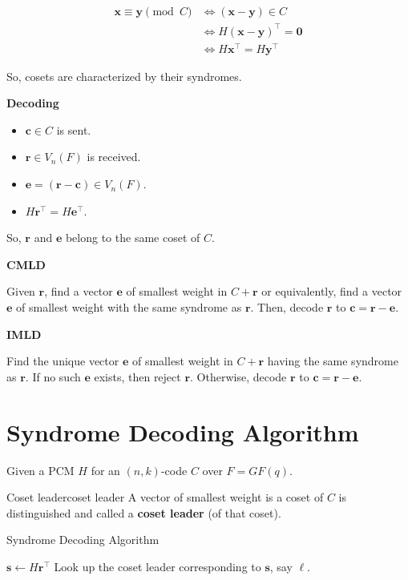 \begin{Proof}{}{}
    \begin{align*}
        \symbf{x}\equiv \symbf{y}\pmod{C}
         & \iff (\symbf{x}-\symbf{y})\in C            \\
         & \iff H(\symbf{x}-\symbf{y})^\top=\symbf{0} \\
         & \iff H\symbf{x}^\top=H\symbf{y}^\top
    \end{align*}
\end{Proof}
So, cosets are characterized by their syndromes.

\textbf{Decoding}
\begin{itemize}
    \item $ \symbf{c}\in C $ is sent.
    \item $ \symbf{r}\in V_n(F) $ is received.
    \item $ \symbf{e}=(\symbf{r}-\symbf{c})\in V_n(F) $.
    \item $ H\symbf{r}^\top=H\symbf{e}^\top $.
\end{itemize}
So, $ \symbf{r} $ and $ \symbf{e} $ belong to the same coset of $ C $.

\textbf{CMLD}

Given $ \symbf{r} $, find a vector $ \symbf{e} $ of smallest weight in $ C+\symbf{r} $
or equivalently, find a vector $ \symbf{e} $ of smallest weight with the same
syndrome as $ \symbf{r} $. Then, decode $ \symbf{r} $ to $ \symbf{c}=\symbf{r}-\symbf{e} $.

\textbf{IMLD}

Find the unique vector $ \symbf{e} $ of smallest weight in $ C+\symbf{r} $
having the same syndrome as $ \symbf{r} $.
If no such $ \symbf{e} $ exists, then reject $ \symbf{r} $.
Otherwise, decode $ \symbf{r} $ to $ \symbf{c}=\symbf{r}-\symbf{e} $.

\section{Syndrome Decoding Algorithm}
Given a PCM $ H $ for an $ (n,k) $-code $ C $ over $ F=GF(q) $.

\begin{Definition}{Coset leader}{coset leader}
    A vector of smallest weight is a coset of $ C $ is distinguished and called
    a \textbf{coset leader} (of that coset).
\end{Definition}

\begin{algorithm}
    \DontPrintSemicolon{}
    \caption{Syndrome Decoding Algorithm}

    $ \symbf{s}\gets H\symbf{r}^\top $\;
    Look up the coset leader corresponding to $ \symbf{s} $, say $ \symbf{\ell} $.\;
\end{algorithm}



